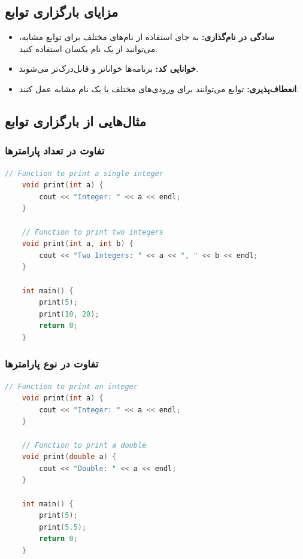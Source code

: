 \documentclass[12pt, a4paper]{report}
\begin{document}
\subsection{مزایای بارگزاری توابع}
\begin{itemize}
\item \textbf{سادگی در نام‌گذاری:} به جای استفاده از نام‌های مختلف برای توابع مشابه، می‌توانید از یک نام یکسان استفاده کنید.
\item \textbf{خوانایی کد:} برنامه‌ها خواناتر و قابل‌درک‌تر می‌شوند.
\item \textbf{انعطاف‌پذیری:} توابع می‌توانند برای ورودی‌های مختلف با یک نام مشابه عمل کنند.
\end{itemize}

\subsection{مثال‌هایی از بارگزاری توابع}
\subsubsection{تفاوت در تعداد پارامترها}

\begin{LTR}
\begin{lstlisting}[language=C++, breaklines=true]
	// Function to print a single integer
	void print(int a) {
		cout << "Integer: " << a << endl;
	}
	
	// Function to print two integers
	void print(int a, int b) {
		cout << "Two Integers: " << a << ", " << b << endl;
	}
	
	int main() {
		print(5);        
		print(10, 20); 
		return 0;
	}
\end{lstlisting}
\end{LTR}

\subsubsection{تفاوت در نوع پارامترها}

\begin{LTR}
\begin{lstlisting}[language=C++, breaklines=true]
	// Function to print an integer
	void print(int a) {
		cout << "Integer: " << a << endl;
	}
	
	// Function to print a double
	void print(double a) {
		cout << "Double: " << a << endl;
	}
	
	int main() {
		print(5);         
		print(5.5);      
		return 0;
	}
\end{lstlisting}
\end{LTR}
\end{document}
